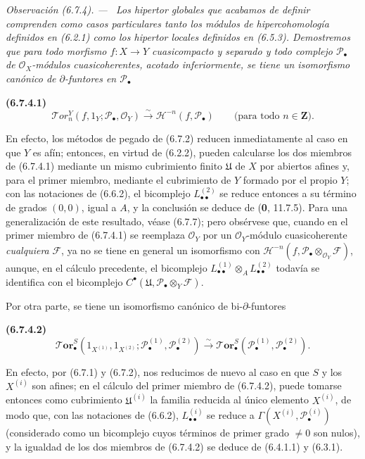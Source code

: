 \documentclass[10pt,oneside]{book}
\newcommand{\oldpage}[2][]{\setcounter{footnote}{0}\marginpar{\scriptsize\textbf{#1}~|~#2}\ignorespaces}
\newenvironment{env}[1][]{\par\medskip\noindent\textbf{(#1)}\ }{\par}
\newenvironment{remark}[1][]{\par\medskip\noindent\itshape Observación (#1). ---\ }{\par}
\begin{document}
\begin{remark}[6.7.4]
\label{III.6.7.4}
Los hipertor globales que acabamos de definir comprenden como casos
particulares tanto los \emph{módulos de hipercohomología} definidos en
(6.2.1) como los \emph{hipertor locales} definidos en (6.5.3). Demostremos que
para todo morfismo $f:X\to Y$ \emph{cuasicompacto} y \emph{separado} y todo complejo
$\mathscr P_\bullet$ de $\mathscr O_X$-módulos cuasicoherentes, acotado
inferiormente, se tiene un isomorfismo canónico de $\partial$-funtores en
$\mathscr P_\bullet$
\begin{env}[6.7.4.1]
\label{III.6.7.4.1}
\[
  \mathscr T\!or_n^Y(f,1_Y;\mathscr P_\bullet,\mathscr O_Y)
  \xrightarrow{\sim}
  \mathcal H^{-n}(f,\mathscr P_\bullet)
  \qquad\text{(para todo $n\in\mathbf Z$)}.
  \tag{6.7.4.1}\label{III.6.7.4.1.eq}
\]
\end{env}
En efecto, los métodos de pegado de (6.7.2) reducen inmediatamente al caso en
que $Y$ es afín; entonces, en virtud de (6.2.2), pueden calcularse los dos
miembros de (6.7.4.1) mediante un mismo cubrimiento finito $\mathfrak U$ de
$X$ por abiertos afines y, para el primer miembro, mediante el cubrimiento de
$Y$ formado por el propio $Y$; con las notaciones de (6.6.2), el bicomplejo
$L_{\bullet\bullet}^{(2)}$ se reduce entonces a su término de grados $(0,0)$,
igual a $A$, y la conclusión se deduce de (\textbf{0}, 11.7.5). Para una
generalización de este resultado, véase (6.7.7); pero obsérvese que, cuando en
el primer miembro de (6.7.4.1) se reemplaza $\mathscr O_Y$ por un
$\mathscr O_Y$-módulo cuasicoherente \emph{cualquiera} $\mathscr F$, ya no
se tiene en general un isomorfismo con
$\mathcal H^{-n}(f,\mathscr P_\bullet\otimes_{\mathscr O_Y}\mathscr F)$,
aunque, en el cálculo precedente, el bicomplejo
$L_{\bullet\bullet}^{(1)}\otimes_A L_{\bullet\bullet}^{(2)}$ todavía se
identifica con el bicomplejo
$C^\bullet(\mathfrak U,\mathscr P_\bullet\otimes_Y\mathscr F)$.

Por otra parte, se tiene un isomorfismo canónico de
bi-$\partial$-funtores
\begin{env}[6.7.4.2]
\label{III.6.7.4.2}
\[
  \boldsymbol{\mathscr T\!or}_\bullet^S
  (1_{X^{(1)}},1_{X^{(2)}};
   \mathscr P_\bullet^{(1)},\mathscr P_\bullet^{(2)})
  \xrightarrow{\sim}
  \boldsymbol{\mathscr{T}\!or}_\bullet^S
  (\mathscr P_\bullet^{(1)},\mathscr P_\bullet^{(2)}).
  \tag{6.7.4.2}\label{III.6.7.4.2.eq}
\]
\end{env}
En efecto, por (6.7.1) y (6.7.2), nos reducimos de nuevo al caso en que $S$ y
los $X^{(i)}$ son afines; en el cálculo del primer miembro de (6.7.4.2), puede
tomarse entonces como
\oldpage[III]{160}
cubrimiento $\mathfrak U^{(i)}$ la familia reducida al
único elemento $X^{(i)}$, de modo que, con las notaciones de (6.6.2),
$L_{\bullet\bullet}^{(i)}$ se reduce a
$\Gamma(X^{(i)},\mathscr P_\bullet^{(i)})$ (considerado como un bicomplejo
cuyos términos de primer grado $\ne0$ son nulos), y la igualdad de los dos
miembros de (6.7.4.2) se deduce de (6.4.1.1) y (6.3.1).
\end{remark}
\end{document}
